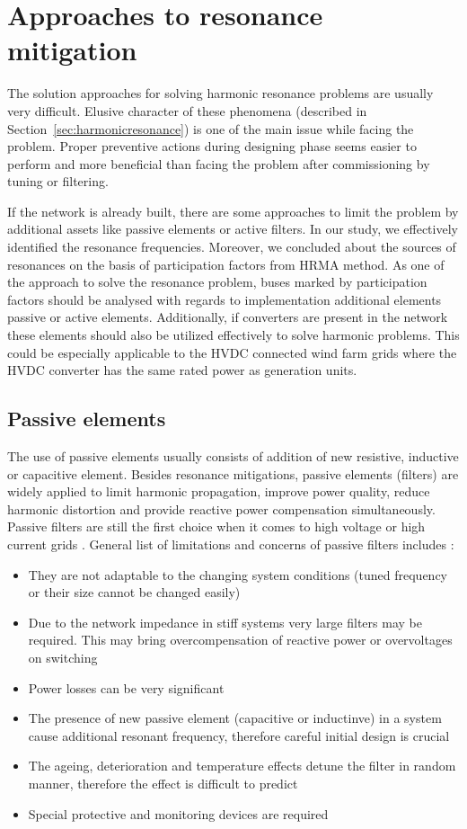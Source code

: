 \documentclass[12pt]{report} %
\begin{document}
\chapter{Approaches to resonance mitigation}
The solution approaches for solving harmonic resonance problems are usually very difficult. Elusive character of these phenomena (described in Section~\ref{sec:harmonicresonance}) is one of the main issue while facing the problem. Proper preventive actions during designing phase seems easier to perform and more beneficial than facing the problem after commissioning by tuning or filtering.

If the network is already built, there are some approaches to limit the problem by additional assets like passive elements or active filters. In our study, we effectively identified the resonance frequencies. Moreover, we concluded about the sources of resonances on the basis of participation factors from HRMA method. As one of the approach to solve the resonance problem, buses marked by participation factors should be analysed with regards to implementation additional elements passive or active elements. Additionally, if converters are present in the network these elements should also be utilized effectively to solve harmonic problems. This could be especially applicable to the HVDC connected wind farm grids where the HVDC converter has the same rated power as generation units.

\section{Passive elements}
The use of passive elements usually consists of addition of new resistive, inductive or capacitive element. Besides resonance mitigations, passive elements (filters) are widely applied to limit harmonic propagation, improve power quality, reduce harmonic distortion and provide reactive power compensation simultaneously. Passive filters are still the first choice when it comes to high voltage or high current grids \cite{das}. General list of limitations and concerns of passive filters includes \cite{das}:
\begin{itemize}
	\item They are not adaptable to the changing system conditions (tuned frequency or their size cannot be changed easily)
	\item Due to the network impedance in stiff systems very large filters may be required. This may bring overcompensation of reactive power or overvoltages on switching
	\item Power losses can be very significant
	\item The presence of new passive element (capacitive or inductinve) in a system cause additional resonant frequency, therefore careful initial design is crucial
	\item The ageing, deterioration and temperature effects detune the filter in random manner, therefore the effect is difficult to predict
	\item Special protective and monitoring devices are required
\end{itemize}
\end{document}
